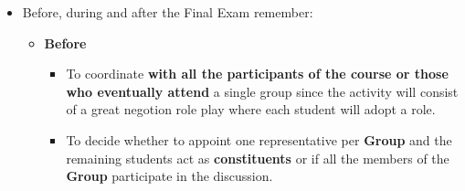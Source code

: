 \documentclass[
  ignorenonframetext,
]{beamer}
\begin{document}
\begin{frame}{}
\label{section-9}
\begin{itemize}
\item
  Before, during and after the Final Exam remember:

  \begin{itemize}
  \item
    \textbf{Before}

    \begin{itemize}
    \item
      To coordinate \textbf{with all the participants of the course or
      those who eventually attend} a single group since the activity
      will consist of a great negotion role play where each student will
      adopt a role.
    \item
      To decide whether to appoint one representative per \textbf{Group}
      and the remaining students act as \textbf{constituents} or if all
      the members of the \textbf{Group} participate in the discussion.
    \end{itemize}
  \end{itemize}
\end{itemize}
\end{frame}
\end{document}
